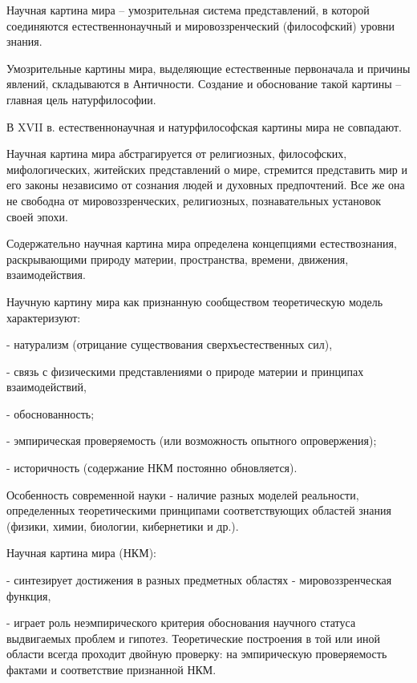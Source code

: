 \documentclass[exam_answers.tex]{subfiles}
\begin{document}
\renewcommand{\baselinestretch}{\blch}

Научная картина мира -- умозрительная система представлений, в которой
соединяются естественнонаучный и мировоззренческий (философский) уровни
знания.

Умозрительные картины мира, выделяющие естественные первоначала и
причины явлений, складываются в Античности. Создание и обоснование
такой картины – главная цель натурфилософии.

В XVII в. естественнонаучная и натурфилософская картины мира не
совпадают.

Научная картина мира абстрагируется от религиозных, философских,
мифологических, житейских представлений о мире, стремится представить мир
и его законы независимо от сознания людей и духовных предпочтений. Все же
она не свободна от мировоззренческих, религиозных, познавательных установок
своей эпохи.

Содержательно научная картина мира определена концепциями
естествознания, раскрывающими природу материи, пространства,
времени, движения, взаимодействия.

Научную картину мира как признанную сообществом теоретическую
модель характеризуют:

- натурализм (отрицание существования сверхъестественных сил),

- связь с физическими представлениями о природе материи и принципах
взаимодействий,

- обоснованность;

- эмпирическая проверяемость (или возможность опытного опровержения);

- историчность (содержание НКМ постоянно обновляется).

Особенность современной науки - наличие разных моделей
реальности, определенных теоретическими принципами
соответствующих областей знания (физики, химии, биологии,
кибернетики и др.).

Научная картина мира (НКМ):

- синтезирует достижения в разных предметных областях -
мировоззренческая функция,

- играет роль неэмпирического критерия обоснования научного статуса
выдвигаемых проблем и гипотез.
Теоретические построения в той или иной области всегда проходит двойную
проверку: на эмпирическую проверяемость фактами и соответствие
признанной НКМ.
\end{document}
